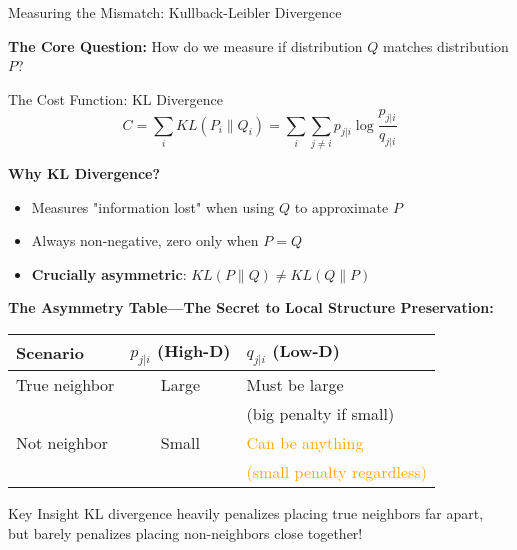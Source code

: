 \documentclass[10pt]{beamer}
\begin{document}
\begin{frame}{Measuring the Mismatch: Kullback-Leibler Divergence}

\textbf{The Core Question:} How do we measure if distribution $Q$ matches distribution $P$?

\vspace{0.2cm}
\begin{block}{The Cost Function: KL Divergence}
\begin{equation}
C = \sum_i KL(P_i \| Q_i) = \sum_i \sum_{j \neq i} p_{j|i} \log \frac{p_{j|i}}{q_{j|i}}
\end{equation}
\end{block}

\vspace{0.15cm}
\textbf{Why KL Divergence?}
\begin{itemize}
    \setlength\itemsep{0em}
    \item Measures "information lost" when using $Q$ to approximate $P$
    \item Always non-negative, zero only when $P = Q$
    \item \textbf{Crucially asymmetric}: $KL(P\|Q) \neq KL(Q\|P)$
\end{itemize}

\vspace{0.15cm}
\textbf{The Asymmetry Table—The Secret to Local Structure Preservation:}
\begin{center}
\begin{tabular}{|l|c|l|}
\hline
\textbf{Scenario} & \textbf{$p_{j|i}$ (High-D)} & \textbf{$q_{j|i}$ (Low-D)} \\
\hline
True neighbor & Large & \textcolor{green!70!black}{Must be large} \\
& & \textcolor{green!70!black}{(big penalty if small)} \\
\hline
Not neighbor & Small & \textcolor{orange}{Can be anything} \\
& & \textcolor{orange}{(small penalty regardless)} \\
\hline
\end{tabular}
\end{center}

\vspace{0.1cm}
\begin{alertblock}{Key Insight}
KL divergence heavily penalizes placing true neighbors far apart,\\
but barely penalizes placing non-neighbors close together!
\end{alertblock}

\end{frame}
\end{document}
